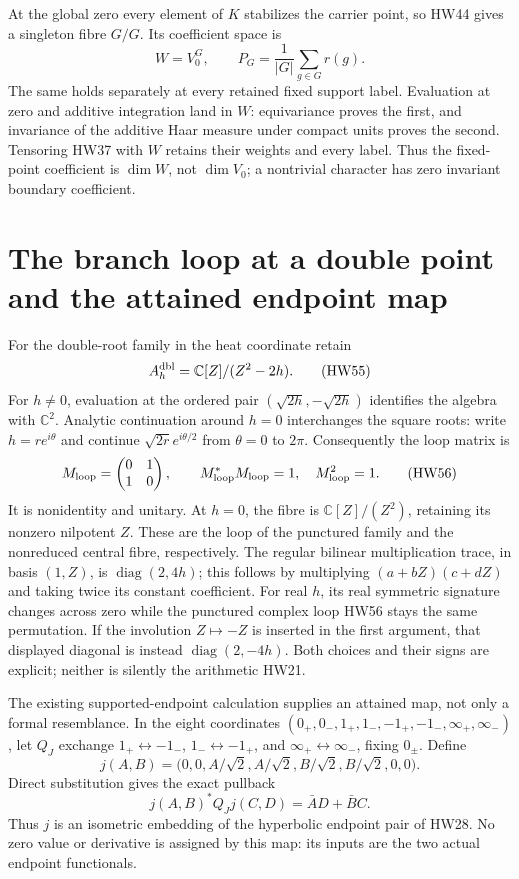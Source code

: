 \documentclass[11pt,a4paper]{article}
\theoremstyle{definition}\newtheorem{definition}[theorem]{Definition}
\newcommand{\C}{\mathbb C}\newcommand{\R}{\mathbb R}
\begin{document}
At the global zero every element of \(K\) stabilizes the
carrier point, so HW44 gives a singleton fibre \(G/G\).
Its coefficient space is
\[
 W=V_0^G,\qquad P_G=\frac1{|G|}\sum_{g\in G}r(g).
 \tag{HW54}
\]
The same holds separately at every retained fixed support
label. Evaluation at zero and additive integration land in
\(W\): equivariance proves the first, and invariance of
the additive Haar measure under compact units proves the
second. Tensoring HW37 with \(W\) retains their weights
and every label. Thus the fixed-point coefficient is
\(\dim W\), not \(\dim V_0\); a nontrivial character has
zero invariant boundary coefficient.

\section{The branch loop at a double point and the attained endpoint map}

For the double-root family in the heat coordinate retain
\[
 A_h^{\rm dbl}=\C[Z]/(Z^2-2h).
 \tag{HW55}
\]
For \(h\ne0\), evaluation at the ordered pair
\((\sqrt{2h},-\sqrt{2h})\) identifies the algebra with
\(\C^2\). Analytic continuation around \(h=0\) interchanges
the square roots: write \(h=re^{i\theta}\) and continue
\(\sqrt{2r}e^{i\theta/2}\) from \(\theta=0\) to \(2\pi\).
Consequently the loop matrix is
\[
 M_{\rm loop}=\begin{pmatrix}0&1\\1&0\end{pmatrix},\qquad
 M_{\rm loop}^*M_{\rm loop}=1,\quad M_{\rm loop}^2=1 .
 \tag{HW56}
\]
It is nonidentity and unitary. At \(h=0\), the fibre is
\(\C[Z]/(Z^2)\), retaining its nonzero nilpotent \(Z\).
These are the loop of the punctured family and the
nonreduced central fibre, respectively.
The regular bilinear multiplication trace, in basis \((1,Z)\), is
\(\operatorname{diag}(2,4h)\); this follows by multiplying
\((a+bZ)(c+dZ)\) and taking twice its constant coefficient.
For real \(h\), its real symmetric signature changes across zero while
the punctured complex loop HW56 stays the same permutation.
If the involution \(Z\mapsto-Z\) is inserted in the first
argument, that displayed diagonal is instead
\(\operatorname{diag}(2,-4h)\). Both choices and their signs
are explicit; neither is silently the arithmetic HW21.

The existing supported-endpoint calculation supplies an
attained map, not only a formal resemblance. In the eight
coordinates \((0_+,0_-,1_+,1_-,-1_+,-1_-,\infty_+,\infty_-)\),
let \(Q_J\) exchange \(1_+\leftrightarrow-1_-\),
\(1_-\leftrightarrow-1_+\), and
\(\infty_+\leftrightarrow\infty_-\), fixing \(0_\pm\).
Define
\[
 j(A,B)=\bigl(0,0,A/\sqrt2,A/\sqrt2,
                       B/\sqrt2,B/\sqrt2,0,0\bigr).
 \tag{HW57}
\]
Direct substitution gives the exact pullback
\[
 j(A,B)^*Q_Jj(C,D)=\bar A D+\bar B C .
 \tag{HW58}
\]
Thus \(j\) is an isometric embedding of the hyperbolic
endpoint pair of HW28. No zero value or derivative is
assigned by this map: its inputs are the two actual
endpoint functionals.
\end{document}
